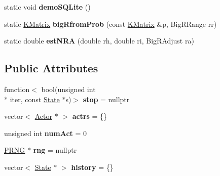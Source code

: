 \begin{DoxyCompactItemize}
\item 
\hypertarget{class_k_base_1_1_model_a1d963fdaaf8e9f40cdc43ed025f0b5c1}{static void {\bfseries demo\-S\-Q\-Lite} ()}\label{class_k_base_1_1_model_a1d963fdaaf8e9f40cdc43ed025f0b5c1}

\item 
\hypertarget{class_k_base_1_1_model_a1ea7a9fdd03329f6bf0234bb4d43edb6}{static \hyperlink{class_k_base_1_1_k_matrix}{K\-Matrix} {\bfseries big\-Rfrom\-Prob} (const \hyperlink{class_k_base_1_1_k_matrix}{K\-Matrix} \&p, Big\-R\-Range rr)}\label{class_k_base_1_1_model_a1ea7a9fdd03329f6bf0234bb4d43edb6}

\item 
\hypertarget{class_k_base_1_1_model_aa13a028a9eb4cad23c934f50f9f70fe4}{static double {\bfseries est\-N\-R\-A} (double rh, double ri, Big\-R\-Adjust ra)}\label{class_k_base_1_1_model_aa13a028a9eb4cad23c934f50f9f70fe4}

\end{DoxyCompactItemize}
\subsection*{Public Attributes}
\begin{DoxyCompactItemize}
\item 
\hypertarget{class_k_base_1_1_model_a0605824758cb36c2e9d4ca15407296a5}{function$<$ bool(unsigned int \\*
iter, const \hyperlink{class_k_base_1_1_state}{State} $\ast$s)$>$ {\bfseries stop} = nullptr}\label{class_k_base_1_1_model_a0605824758cb36c2e9d4ca15407296a5}

\item 
\hypertarget{class_k_base_1_1_model_a4fb640f320147e67c05c0de5bd33922e}{vector$<$ \hyperlink{class_k_base_1_1_actor}{Actor} $\ast$ $>$ {\bfseries actrs} = \{\}}\label{class_k_base_1_1_model_a4fb640f320147e67c05c0de5bd33922e}

\item 
\hypertarget{class_k_base_1_1_model_a54dbb244fe386a7d9c4f29f1b14ba07a}{unsigned int {\bfseries num\-Act} = 0}\label{class_k_base_1_1_model_a54dbb244fe386a7d9c4f29f1b14ba07a}

\item 
\hypertarget{class_k_base_1_1_model_a863472bdfea740b5978f961be09ee6c8}{\hyperlink{class_k_base_1_1_p_r_n_g}{P\-R\-N\-G} $\ast$ {\bfseries rng} = nullptr}\label{class_k_base_1_1_model_a863472bdfea740b5978f961be09ee6c8}

\item 
\hypertarget{class_k_base_1_1_model_adc4ad033725b177ba804e4aeab3b6a98}{vector$<$ \hyperlink{class_k_base_1_1_state}{State} $\ast$ $>$ {\bfseries history} = \{\}}\label{class_k_base_1_1_model_adc4ad033725b177ba804e4aeab3b6a98}

\end{DoxyCompactItemize}
